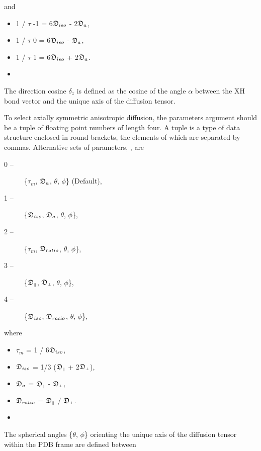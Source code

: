  and 
  

 \begin{itemize} 
 \item[] 1 / $\tau$ -1 = 6$\mathfrak{D}_{iso}$ - 2$\mathfrak{D}_a$,  
 \item[] 1 / $\tau$ 0  = 6$\mathfrak{D}_{iso}$ - $\mathfrak{D}_a$,  
 \item[] 1 / $\tau$ 1  = 6$\mathfrak{D}_{iso}$ + 2$\mathfrak{D}_a$.  
 \item[]  
 \end{itemize} 
  

 The direction cosine $\delta_z$ is defined as the cosine of the angle $\alpha$ between the XH bond vector and the unique axis of the diffusion tensor. 
  

 To select axially symmetric anisotropic diffusion, the parameters argument should be a tuple of floating point numbers of length four.  A tuple is a type of data structure enclosed in round brackets, the elements of which are separated by commas.  Alternative sets of parameters, , are 
  

 \begin{description} 
 \item[0 --]  \{$\tau_m$, $\mathfrak{D}_a$, $\theta$, $\phi$\}   (Default),  
 \item[1 --]  \{$\mathfrak{D}_{iso}$, $\mathfrak{D}_a$, $\theta$, $\phi$\},  
 \item[2 --]  \{$\tau_m$, $\mathfrak{D}_{ratio}$, $\theta$, $\phi$\},  
 \item[3 --]  \{$\mathfrak{D}_{\scriptscriptstyle \parallel}$, $\mathfrak{D}_{\scriptscriptstyle \perp}$, $\theta$, $\phi$\},  
 \item[4 --]  \{$\mathfrak{D}_{iso}$, $\mathfrak{D}_{ratio}$, $\theta$, $\phi$\},  
 \end{description} 
  

 where 
  

 \begin{itemize} 
 \item[] $\tau_m$ = 1 / 6$\mathfrak{D}_{iso}$,  
 \item[] $\mathfrak{D}_{iso}$ = 1/3 ($\mathfrak{D}_{\scriptscriptstyle \parallel}$ + 2$\mathfrak{D}_{\scriptscriptstyle \perp}$),  
 \item[] $\mathfrak{D}_a$ = $\mathfrak{D}_{\scriptscriptstyle \parallel}$ - $\mathfrak{D}_{\scriptscriptstyle \perp}$,  
 \item[] $\mathfrak{D}_{ratio}$ = $\mathfrak{D}_{\scriptscriptstyle \parallel}$ / $\mathfrak{D}_{\scriptscriptstyle \perp}$.  
 \item[]  
 \end{itemize} 
  

 The spherical angles \{$\theta$, $\phi$\} orienting the unique axis of the diffusion tensor within the PDB frame are defined between 
  

